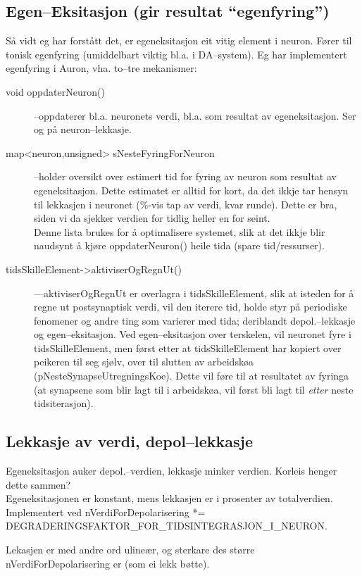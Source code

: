 \subsection{Egen--Eksitasjon (gir resultat ``egenfyring'')}
Så vidt eg har forstått det, er egeneksitasjon eit vitig element i neuron. Fører til tonisk egenfyring (umiddelbart viktig bl.a. i DA--system).
Eg har implementert egenfyring i Auron, vha. to--tre mekanismer:
\begin{description}
	\item[void oppdaterNeuron()] --oppdaterer bl.a. neuronets verdi, bl.a. som resultat av egeneksitasjon. Ser og på neuron--lekkasje.
	\item[map<neuron,unsigned> sNesteFyringForNeuron] --holder oversikt over estimert tid for fyring av neuron som resultat av egeneksitasjon. Dette estimatet er alltid for kort, da det ikkje tar hensyn til lekkasjen i neuronet (\%-vis tap av verdi, kvar runde). Dette er bra, siden vi da sjekker verdien for tidlig heller en for seint.\\
Denne lista brukes for å optimalisere systemet, slik at det ikkje blir naudsynt å kjøre oppdaterNeuron() heile tida (spare tid/ressurser).
	\item[tidsSkilleElement->aktiviserOgRegnUt()] ---aktiviserOgRegnUt er overlagra i tidsSkilleElement, slik at isteden for å regne ut postsynaptisk verdi, vil den iterere tid, holde styr på periodiske fenomener og andre ting som varierer med tida; deriblandt depol.--lekkasje og egen--eksitasjon. Ved egen--eksitasjon over terskelen, vil neuronet fyre i tidsSkilleElement, men først etter at tidsSkilleElement har kopiert over peikeren til seg sjølv, over til slutten av arbeidskøa (pNesteSynapseUtregningsKoe). Dette vil føre til at resultatet av fyringa (at synapsene som blir lagt til i arbeidskøa, vil først bli lagt til \emph{etter} neste tidsiterasjon).
\end{description}

\subsection{Lekkasje av verdi, depol--lekkasje}
Egeneksitasjon auker depol.--verdien, lekkasje minker verdien. Korleis henger dette sammen?\\
Egeneksitasjonen er konstant, mens lekkasjen er i prosenter av totalverdien. Implementert ved 
nVerdiForDepolarisering *= DEGRADERINGSFAKTOR\_FOR\_TIDSINTEGRASJON\_I\_NEURON.

Lekasjen er med andre ord ulineær, og sterkare des større nVerdiForDepolarisering er (som ei lekk bøtte).

